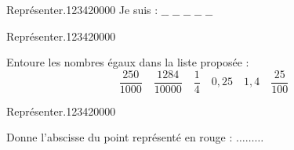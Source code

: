 \begin{pageParcoursd}
\begin{ExoCd}{Représenter.}{1234}{2}{0}{0}{0}{0}
Je suis : $\_\_$ $\_\_$ $\_\_$ $\_\_$ $\_\_$   
 

 
\end{ExoCd}

\begin{ExoCd}{Représenter.}{1234}{2}{0}{0}{0}{0}

Entoure les nombres égaux  dans la liste proposée : 
$$\dfrac{250}{1000} \quad  \dfrac{1284}{10000} \quad \dfrac{1}{4}  \quad 0,25 \quad 1,4 \quad \dfrac{25}{100}$$
 

\end{ExoCd}

\begin{ExoCd}{Représenter.}{1234}{2}{0}{0}{0}{0}
 
Donne l'abscisse du point représenté en rouge :  $\ldots\ldots\ldots$
 

\end{ExoCd}
\end{pageParcoursd}
